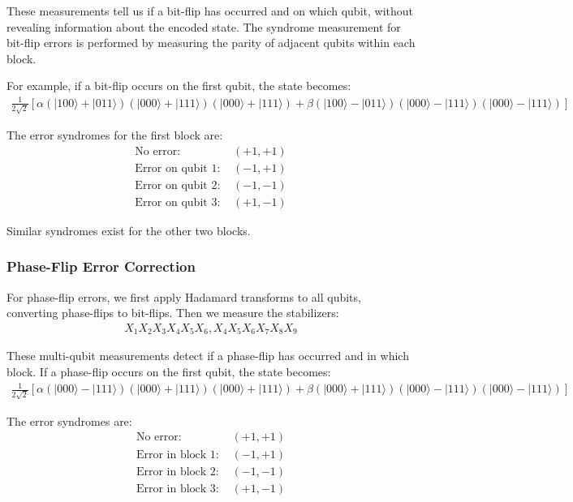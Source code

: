 \documentclass[12pt,a4paper]{article}
\begin{document}
These measurements tell us if a bit-flip has occurred and on which qubit, without revealing information about the encoded state. The syndrome measurement for bit-flip errors is performed by measuring the parity of adjacent qubits within each block.

For example, if a bit-flip occurs on the first qubit, the state becomes:
\begin{align}
\frac{1}{2\sqrt{2}}[\alpha(|100\rangle+|011\rangle)(|000\rangle+|111\rangle)(|000\rangle+|111\rangle) + \beta(|100\rangle-|011\rangle)(|000\rangle-|111\rangle)(|000\rangle-|111\rangle)]
\end{align}

The error syndromes for the first block are:
\begin{align}
\text{No error: } &(+1, +1) \\
\text{Error on qubit 1: } &(-1, +1) \\
\text{Error on qubit 2: } &(-1, -1) \\
\text{Error on qubit 3: } &(+1, -1)
\end{align}

Similar syndromes exist for the other two blocks.

\subsubsection{Phase-Flip Error Correction}

For phase-flip errors, we first apply Hadamard transforms to all qubits, converting phase-flips to bit-flips. Then we measure the stabilizers:
\begin{align}
X_1X_2X_3X_4X_5X_6, X_4X_5X_6X_7X_8X_9
\end{align}

These multi-qubit measurements detect if a phase-flip has occurred and in which block. If a phase-flip occurs on the first qubit, the state becomes:
\begin{align}
\frac{1}{2\sqrt{2}}[\alpha(|000\rangle-|111\rangle)(|000\rangle+|111\rangle)(|000\rangle+|111\rangle) + \beta(|000\rangle+|111\rangle)(|000\rangle-|111\rangle)(|000\rangle-|111\rangle)]
\end{align}

The error syndromes are:
\begin{align}
\text{No error: } &(+1, +1) \\
\text{Error in block 1: } &(-1, +1) \\
\text{Error in block 2: } &(-1, -1) \\
\text{Error in block 3: } &(+1, -1)
\end{align}
\end{document}
